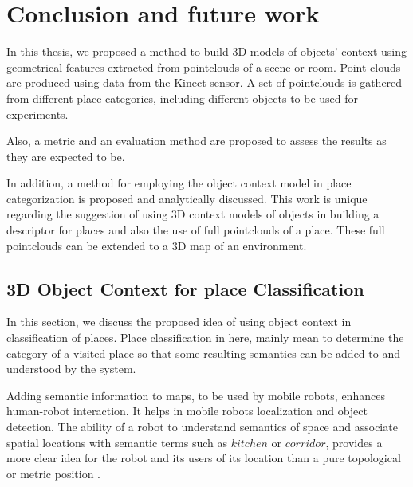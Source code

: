 \chapter{Conclusion and future work}
\label{Conclusion.ch}
In this thesis, we proposed a method to build 3D models of objects' context using geometrical features extracted
from pointclouds of a scene or room.
Point-clouds are produced using data from the Kinect sensor.
A set of pointclouds is gathered from different place categories, including different objects to be used for experiments.

Also, a metric and an evaluation method are proposed to assess the results as they are expected to be.

In addition, a method for employing the object context model in place categorization is proposed and analytically discussed.
This work is unique regarding the suggestion of using 3D context models of objects in building a descriptor for places and also the use of full 
pointclouds of a place. 
These full pointclouds can be extended to a 3D map of an environment.

\section{3D Object Context for place Classification}
\label{3D Object Context for place Classification.sec}

In this section, we discuss the proposed idea of using object context in classification of places.
Place classification in here, mainly mean to determine the category of a visited place so that some resulting semantics 
can be added to and understood by the system.

Adding semantic information to maps, to be used by mobile robots, enhances human-robot interaction.
It helps in mobile robots localization and object detection.
The ability of a robot to understand semantics of space and associate spatial locations with semantic terms 
such as $kitchen$ or $corridor$, provides a more clear idea for the robot and its users of its location than a pure 
topological or metric position \cite{pronobis2011phd}.   

